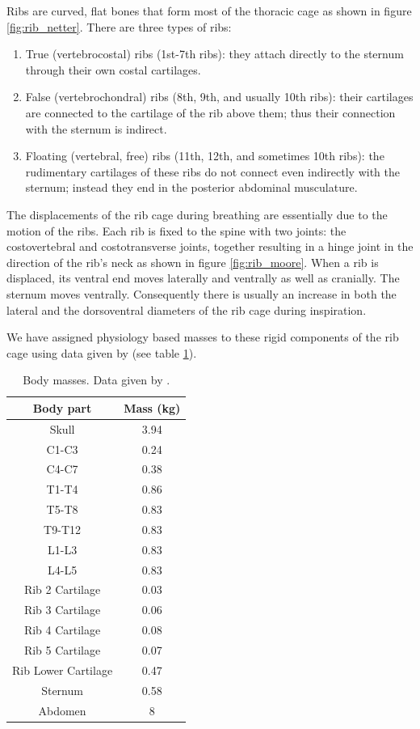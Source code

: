 Ribs are curved, flat bones that form most of the thoracic cage as shown in figure \ref{fig:rib_netter}. There are three types of ribs:

\begin{enumerate}
	\item True (vertebrocostal) ribs (1st-7th ribs): they attach directly to the sternum through their own costal cartilages.
	\item False (vertebrochondral) ribs (8th, 9th, and usually 10th ribs): their cartilages are connected to the cartilage of the rib above them; thus their connection with the sternum is indirect.
	\item Floating (vertebral, free) ribs (11th, 12th, and sometimes 10th ribs): the rudimentary cartilages of these ribs do not connect even indirectly with the sternum; instead they end in the posterior abdominal musculature.
\end{enumerate}	

The displacements of the rib cage during breathing are essentially due to the motion of the ribs. Each rib is fixed to the spine with two joints: the costovertebral and costotransverse joints, together resulting in a hinge joint in the direction of the rib's neck as shown in figure \ref{fig:rib_moore}. When a rib is displaced, its ventral end moves laterally and ventrally as well as cranially. The sternum moves ventrally. Consequently there is usually an increase in both the lateral and the dorsoventral diameters of the rib cage during inspiration.

We have assigned physiology based masses to these rigid components of the rib cage using data given by \cite{dilorenzo2009breathing} (see table \ref{tab:body_masses}).

\begin{table}
\begin{center}
\begin{tabular}{|c|c|}
\hline
 Body part & Mass (kg)\\ 
\hline
\hline
 Skull & 3.94 \\
 C1-C3 & 0.24 \\ 
 C4-C7 & 0.38 \\ 
 T1-T4 & 0.86 \\ 
 T5-T8 & 0.83 \\ 
 T9-T12 & 0.83 \\ 
 L1-L3 & 0.83 \\ 
 L4-L5 & 0.83 \\ 
 Rib 2 Cartilage & 0.03 \\ 
 Rib 3 Cartilage & 0.06 \\ 
 Rib 4 Cartilage & 0.08 \\
 Rib 5 Cartilage & 0.07 \\ 
 Rib Lower Cartilage & 0.47 \\ 
 Sternum & 0.58 \\ 
 Abdomen & 8 \\ 
  
\hline
\end{tabular}
\end{center}
\caption[Body masses]{\label{tab:body_masses}Body masses. Data given by \cite{dilorenzo2009breathing}.}
\end{table}

